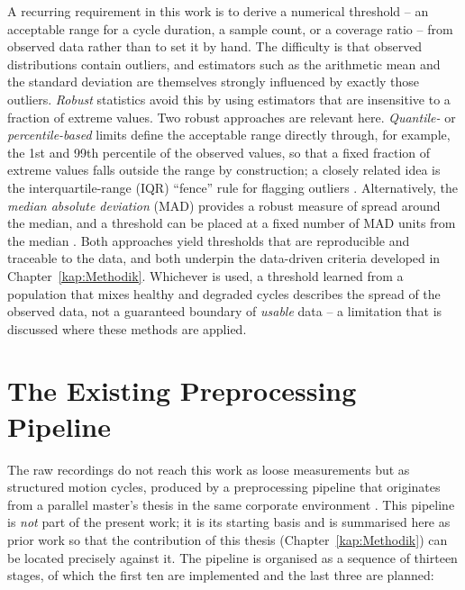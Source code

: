 A recurring requirement in this work is to derive a numerical threshold -- an acceptable
range for a cycle duration, a sample count, or a coverage ratio -- from observed data
rather than to set it by hand. The difficulty is that observed distributions contain
outliers, and estimators such as the arithmetic mean and the standard deviation are
themselves strongly influenced by exactly those outliers. \emph{Robust} statistics avoid
this by using estimators that are insensitive to a fraction of extreme values. Two robust
approaches are relevant here. \emph{Quantile-} or \emph{percentile-based} limits define
the acceptable range directly through, for example, the 1st and 99th percentile of the
observed values, so that a fixed fraction of extreme values falls outside the range by
construction; a closely related idea is the interquartile-range (IQR) ``fence'' rule for
flagging outliers \parencite{TODO-tukey-eda}. Alternatively, the \emph{median absolute
deviation} (MAD) provides a robust measure of spread around the median, and a threshold can
be placed at a fixed number of MAD units from the median \parencite{TODO-robust-statistics-mad}.
Both approaches yield thresholds that are reproducible and traceable to the data, and both
underpin the data-driven criteria developed in Chapter~\ref{kap:Methodik}. Whichever is
used, a threshold learned from a population that mixes healthy and degraded cycles
describes the spread of the observed data, not a guaranteed boundary of \emph{usable} data
-- a limitation that is discussed where these methods are applied.

\section{The Existing Preprocessing Pipeline}
\label{sec:Grundlagen_Pipeline}

The raw recordings do not reach this work as loose measurements but as structured motion
cycles, produced by a preprocessing pipeline that originates from a parallel master's
thesis in the same corporate environment \parencite{TODO-heydari-2026}. This pipeline is
\emph{not} part of the present work; it is its starting basis and is summarised here as
prior work so that the contribution of this thesis (Chapter~\ref{kap:Methodik}) can be
located precisely against it. The pipeline is organised as a sequence of thirteen stages, of
which the first ten are implemented and the last three are planned:


